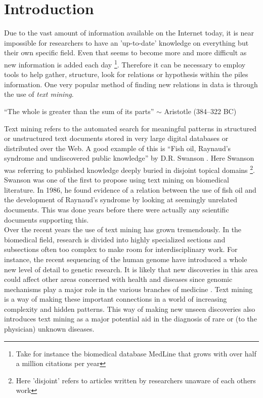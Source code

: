 \chapter{Introduction\label{Introduction}}

Due to the vast amount of information available on the Internet today,
it is near impossible for researchers to have an 'up-to-date'
knowledge on everything but their own specific field. Even that seems
to become more and more difficult as new information is added each day
\cite{CitAddMedLine} \footnote{Take for instance the biomedical
  database MedLine that grows with over half a million citations per
  year}. Therefore it can be necessary to employ tools to help gather,
structure, look for relations or hypothesis within the piles
information. One very popular method of finding new relations in data
is through the use of \textit{text mining}.

\begin{center}
{\small``The whole is greater than the sum of its parts'' $\sim$ Aristotle
(384--322 BC)} 
\end{center}

Text mining refers to the automated search for meaningful patterns in
structured or unstructured text documents stored in very large digital
databases or distributed over the Web. A good example of this is
``Fish oil, Raynaud's syndrome and undiscovered public knowledge'' by
D.R. Swanson . Here
Swanson was referring to published knowledge deeply buried in disjoint
topical domains \footnote{Here 'disjoint' refers to articles written
  by researchers unaware of each others work}. Swanson was one of the
first to propose using text mining on biomedical literature. In 1986,
he found evidence of a relation between the use of fish oil and the
development of Raynaud's syndrome by looking at seemingly unrelated
documents. This was done years before there were actually any
scientific documents supporting this. \\

Over the recent years the use of text mining has grown
tremendously. In the biomedical field, research is divided into highly
specialized sections and subsections often too complex to make room
for interdisciplinary work. For instance, the recent sequencing of the
human genome have introduced a whole new level of detail to genetic
research. It is likely that new discoveries in this area could affect
other areas concerned with health and diseases since genomic
mechanisms play a major role in the various branches of medicine
\cite{survey.biomed.text.cohen.2005}. Text mining is a way of making
these important connections in a world of increasing complexity and
hidden patterns. This way of making new unseen discoveries also
introduces text mining as a major potential aid in the diagnosis of
rare or (to the physician) unknown diseases.\\

